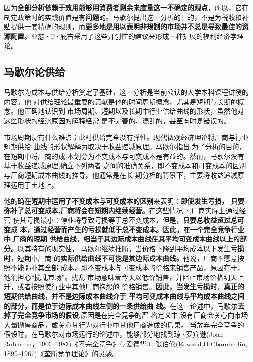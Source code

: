因为\textbf{全部分析依赖于效用能够用消费者剩余来度量这一不确定的观点}，所以，它在
制定政策时的实践价值是\textbf{有问题}的。马歇尔提出这一分析的目的，不是为税收和补
贴提供一套精确的规则，而\textbf{更多地是用以表明非规制的市场并不总是导致最佳的资
  源配置}。亚瑟·C·庇古采用了这些开创性的建议来形成一种扩展的福利经济学理论。

\subsection{马歇尔论供给}

马歇尔为成本与供给分析奠定了基础，这一分析是当前公认的大学本科课程讲授的内容。他
对供给理论最重要的贡献是他的时间周期概念，尤其是短期与长期的概念。他正确地认识到
市场周期、短期以及长期中行业供给曲线的形状，虽然他对这些形状的经济原因的解释经常
是不完善的、混乱的，甚至有时是错误的。

市场周期没有什么难点；此时供给完全没有弹性。现代微观经济理论将厂商与行业短期供给
曲线的形状解释为取决于收益递减原理。马歇尔指出,为了分析的目的，在短期中将厂商的成
本划分为不变成本与可变成本是有益的。然而，马歇尔没有基于收益递减原理,确立下列两者
之间的准确关系，即不变成本和可变成本的区别与厂商短期成本曲线的推导。他通常是在长
期分析的背景下，主要将收益递减原理运用于土地上。

他的确\textbf{在短期中运用了不变成本与可变成本的区别}来表明：\textbf{即使发生亏损，
  只要弥补了总可变成本,厂商将会在短期内继续经营。}在这些情况下,厂商实际上通过经营
使其亏损最小：停业将导致亏损等于总不变成本，但是，\textbf{只要总收益超过总可变成
  本，通过经营而产生的亏损就低于总不变成本。因此，在一个完全竞争行业中,厂商的短期
  供给曲线，相当于其边际成本曲线在其平均可变成本曲线以上的部分。}以其特有的现实性，
马歇尔继续推断，当价格下降到平均成本以下发生\textbf{亏损时}，短期中厂商
的\textbf{实际供给曲线不可能是其边际成本曲线。}他说，厂商不愿意按照不能弥补其全部
成本，即不变成本与可变成本的价格来销售产品，原因在于，他们担心“扰乱市场”。扰乱
市场意味着今天以低价销售，并阻止市场价格明天上升，或者按照使行业中其他厂商抱怨的
价格销售。\textbf{因此，当发生亏损时，真正的短期供给曲线，并不是边际成本曲线介于
  平均可变成本曲线与平均成本曲线之间的部分，而是位于边际成本曲线左侧的一条供给曲
  线。}在这一论述中，马歇尔\textbf{去掉了完全竞争市场的假设},原因是在完全竞争的严
格定义中,没有厂商会关心向市场大量抛售商品，或关心其行为对行业中其他厂商造成的后果。
当放弃完全竞争的假设时，在马歇尔对市场运行的论述中，能够部分地找到琼·罗宾逊(Joan
Robinson，1903--1983)《不完全竞争》与爱德华.H.张伯伦(Edward H.Chamberlin,
1899--1967)《垄断竞争理论》的灵感。

